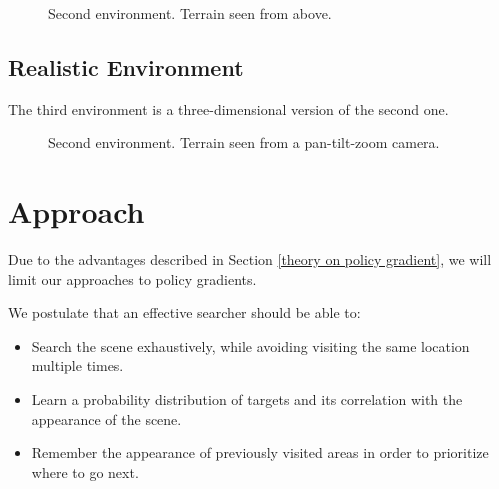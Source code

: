 \begin{figure}
    \centering
    
    \label{fig:terrain}
    \caption[Terrain environment]{Second environment. Terrain seen from above.}
\end{figure}

\subsection{Realistic Environment}

The third environment is a three-dimensional version of the second one.

\begin{figure}
    \centering
    
    \label{fig:camera}
    \caption[Camera environment]{Second environment. Terrain seen from a pan-tilt-zoom camera.}
\end{figure}

\section{Approach}
\label{sec:approach}

Due to the advantages described in Section \ref{theory on policy gradient}, we will limit our approaches to policy gradients.







We postulate that an effective searcher should be able to:

\begin{itemize}
    \item Search the scene exhaustively, while avoiding visiting the same location multiple times.
    \item Learn a probability distribution of targets and its correlation with the appearance of the scene.
    \item Remember the appearance of previously visited areas in order to prioritize where to go next.
\end{itemize}

